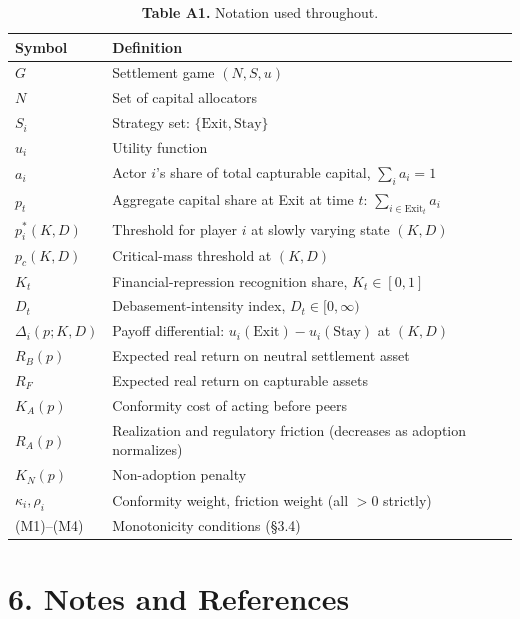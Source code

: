 \documentclass[12pt]{article}
\theoremstyle{definition}
\theoremstyle{remark}
\begin{document}
\begin{table}[h]
\centering
\caption*{\textbf{Table A1.} Notation used throughout.}
\begin{tabularx}{\textwidth}{lX}
\toprule
Symbol & Definition \\
\midrule
$G$ & Settlement game $(N, S, u)$ \\
$N$ & Set of capital allocators \\
$S_i$ & Strategy set: $\{\text{Exit}, \text{Stay}\}$ \\
$u_i$ & Utility function \\
$a_i$ & Actor $i$'s share of total capturable capital, $\sum_i a_i = 1$ \\
$p_t$ & Aggregate capital share at Exit at time $t$: $\sum_{i \in \text{Exit}_t} a_i$ \\
$p_i^*(K, D)$ & Threshold for player $i$ at slowly varying state $(K, D)$ \\
$p_c(K, D)$ & Critical-mass threshold at $(K, D)$ \\
$K_t$ & Financial-repression recognition share, $K_t \in [0, 1]$ \\
$D_t$ & Debasement-intensity index, $D_t \in [0, \infty)$ \\
$\Delta_i(p; K, D)$ & Payoff differential: $u_i(\text{Exit}) - u_i(\text{Stay})$ at $(K, D)$ \\
$R_B(p)$ & Expected real return on neutral settlement asset \\
$R_F$ & Expected real return on capturable assets \\
$K_A(p)$ & Conformity cost of acting before peers \\
$R_A(p)$ & Realization and regulatory friction (decreases as adoption normalizes) \\
$K_N(p)$ & Non-adoption penalty \\
$\kappa_i, \rho_i$ & Conformity weight, friction weight (all $> 0$ strictly) \\
(M1)--(M4) & Monotonicity conditions (\S3.4) \\
\bottomrule
\end{tabularx}
\end{table}

\clearpage
\section{6. Notes and References}
\end{document}
